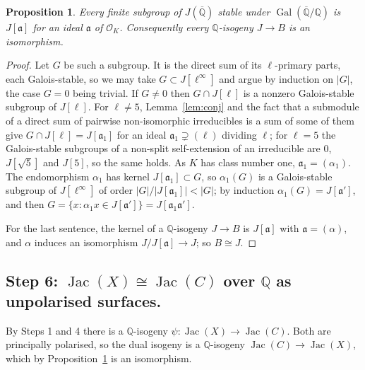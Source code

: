 \documentclass[11pt,reqno]{amsart}
\theoremstyle{plain}
\newtheorem{proposition}[theorem]{Proposition}
\theoremstyle{definition}
\DeclareMathOperator{\Jac}{Jac}
\DeclareMathOperator{\Gal}{Gal}
\newcommand{\Q}{\mathbb{Q}}
\newcommand{\Qbar}{\overline{\mathbb{Q}}}
\newcommand{\OK}{\mathcal{O}_K}
\begin{document}
\begin{proposition}\label{prop:iso}
Every finite subgroup of $J(\Qbar)$ stable under $\Gal(\Qbar/\Q)$ is $J[\mathfrak a]$ for an ideal
$\mathfrak a$ of $\OK$. Consequently every $\Q$-isogeny $J\to B$ is an isomorphism.
\end{proposition}
\begin{proof}
Let $G$ be such a subgroup. It is the direct sum of its $\ell$-primary parts, each Galois-stable, so
we may take $G\subset J[\ell^\infty]$ and argue by induction on $|G|$, the case $G=0$ being
trivial. If $G\neq0$ then $G\cap J[\ell]$ is a nonzero Galois-stable subgroup of $J[\ell]$. For
$\ell\ne5$, Lemma~\ref{lem:conj} and the fact that a submodule of a direct sum of pairwise
non-isomorphic irreducibles is a sum of some of them give $G\cap J[\ell]=J[\mathfrak a_1]$ for an
ideal $\mathfrak a_1\supsetneq(\ell)$ dividing $\ell$; for $\ell=5$ the Galois-stable subgroups of a
non-split self-extension of an irreducible are $0$, $J[\sqrt5]$ and $J[5]$, so the same holds. As
$K$ has class number one, $\mathfrak a_1=(\alpha_1)$. The endomorphism $\alpha_1$ has kernel
$J[\mathfrak a_1]\subset G$, so $\alpha_1(G)$ is a Galois-stable subgroup of $J[\ell^\infty]$ of
order $|G|/|J[\mathfrak a_1]|<|G|$; by induction $\alpha_1(G)=J[\mathfrak a']$, and then
$G=\{x: \alpha_1x\in J[\mathfrak a']\}=J[\mathfrak a_1\mathfrak a']$.

For the last sentence, the kernel of a $\Q$-isogeny $J\to B$ is $J[\mathfrak a]$ with $\mathfrak
a=(\alpha)$, and $\alpha$ induces an isomorphism $J/J[\mathfrak a]\to J$; so $B\cong J$.
\end{proof}

\subsection*{Step 6: $\Jac(X)\cong\Jac(C)$ over $\Q$ as unpolarised surfaces.}
By Steps 1 and 4 there is a $\Q$-isogeny $\psi\colon\Jac(X)\to\Jac(C)$. Both are principally
polarised, so the dual isogeny is a $\Q$-isogeny $\Jac(C)\to\Jac(X)$, which by
Proposition~\ref{prop:iso} is an isomorphism.
\end{document}
